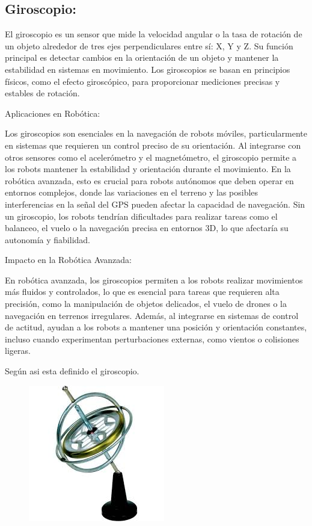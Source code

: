 \subsection{\textbf{Giroscopio}:}	
El giroscopio es un sensor que mide la velocidad angular o la tasa de rotación de un objeto alrededor de tres ejes perpendiculares entre sí: X, Y y Z. Su función principal es detectar cambios en la orientación de un objeto y mantener la estabilidad en sistemas en movimiento. Los giroscopios se basan en principios físicos, como el efecto giroscópico, para proporcionar mediciones precisas y estables de rotación.


Aplicaciones en Robótica:


Los giroscopios son esenciales en la navegación de robots móviles, particularmente en sistemas que requieren un control preciso de su orientación. Al integrarse con otros sensores como el acelerómetro y el magnetómetro, el giroscopio permite a los robots mantener la estabilidad y orientación durante el movimiento. En la robótica avanzada, esto es crucial para robots autónomos que deben operar en entornos complejos, donde las variaciones en el terreno y las posibles interferencias en la señal del GPS pueden afectar la capacidad de navegación. Sin un giroscopio, los robots tendrían dificultades para realizar tareas como el balanceo, el vuelo o la navegación precisa en entornos 3D, lo que afectaría su autonomía y fiabilidad.


Impacto en la Robótica Avanzada:


En robótica avanzada, los giroscopios permiten a los robots realizar movimientos más fluidos y controlados, lo que es esencial para tareas que requieren alta precisión, como la manipulación de objetos delicados, el vuelo de drones o la navegación en terrenos irregulares. Además, al integrarse en sistemas de control de actitud, ayudan a los robots a mantener una posición y orientación constantes, incluso cuando experimentan perturbaciones externas, como vientos o colisiones ligeras.

Según \cite{grewal2014kalman} asi esta definido el giroscopio.

\begin{figure} [h]
	\centering
	\includegraphics[width=0.2\linewidth]{img/giroscopio}
	\caption{}
	\label{fig:giroscopio}
\end{figure}

